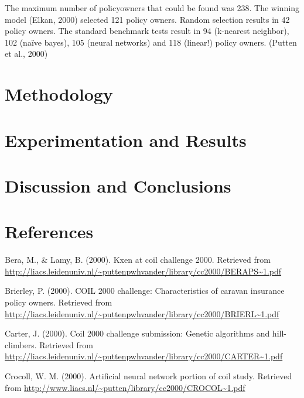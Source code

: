 \documentclass[man]{apa6}
\begin{document}
The maximum number of policyowners that could be found was 238. The winning model (Elkan, 2000) selected 121 policy owners. Random selection results in 42 policy owners. The standard benchmark tests result in 94 (k-nearest neighbor), 102 (naïve bayes), 105 (neural networks) and 118 (linear!) policy owners. (Putten et al., 2000)

\hypertarget{methodology}{%
\section{Methodology}\label{methodology}}

\hypertarget{experimentation-and-results}{%
\section{Experimentation and Results}\label{experimentation-and-results}}

\hypertarget{discussion-and-conclusions}{%
\section{Discussion and Conclusions}\label{discussion-and-conclusions}}

\newpage

\hypertarget{references}{%
\section{References}\label{references}}

\begingroup
\setlength{\parindent}{-0.5in}
\setlength{\leftskip}{0.5in}

\hypertarget{refs}{}
\leavevmode\hypertarget{ref-Bera}{}%
Bera, M., \& Lamy, B. (2000). Kxen at coil challenge 2000. Retrieved from \url{http://liacs.leidenuniv.nl/~puttenpwhvander/library/cc2000/BERAPS~1.pdf}

\leavevmode\hypertarget{ref-Brierley}{}%
Brierley, P. (2000). COIL 2000 challenge: Characteristics of caravan insurance policy owners. Retrieved from \url{http://liacs.leidenuniv.nl/~puttenpwhvander/library/cc2000/BRIERL~1.pdf}

\leavevmode\hypertarget{ref-Carter}{}%
Carter, J. (2000). Coil 2000 challenge submission: Genetic algorithms and hill-climbers. Retrieved from \url{http://liacs.leidenuniv.nl/~puttenpwhvander/library/cc2000/CARTER~1.pdf}

\leavevmode\hypertarget{ref-Crocoll}{}%
Crocoll, W. M. (2000). Artificial neural network portion of coil study. Retrieved from \url{http://www.liacs.nl/~putten/library/cc2000/CROCOL~1.pdf}
\end{document}
